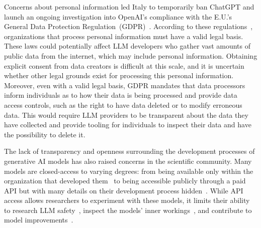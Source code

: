 \documentclass[10pt]{article} %
\begin{document}
Concerns about personal information led Italy to temporarily ban ChatGPT and launch an ongoing investigation into OpenAI's compliance with the E.U.'s General Data Protection Regulation~(GDPR)~\citep{bbc2023chatgpt_ban}. According to these regulations~\citep{eu2018gdpr,lomas2023gdpr_llms}, organizations that process personal information must have a valid legal basis. These laws could potentially affect LLM developers who gather vast amounts of public data from the internet, which may include personal information. Obtaining explicit consent from data creators is difficult at this scale, and it is uncertain whether other legal grounds exist for processing this personal information. Moreover, even with a valid legal basis, GDPR mandates that data processors inform individuals as to how their data is being processed and provide data access controls, such as the right to have data deleted or to modify erroneous data. This would require LLM providers to be transparent about the data they have collected and provide tooling for individuals to inspect their data and have the possibility to delete it.    

The lack of transparency and openness surrounding the development processes of generative AI models has also raised concerns in the scientific community. 
Many models are closed-access to varying degrees: from being available only within the organization that developed them~\citep{chowdhery2022palm,hoffmann2022training} to being accessible publicly through a paid API but with many details on their development process hidden~\citep{brown2020language,openai2023gpt4}.
While API access allows researchers to experiment with these models, it limits their ability to research LLM safety~\citep{perez2022red}, inspect the models' inner workings~\citep{olsson2022context}, and contribute to model improvements~\citep{togelius2023choose}. %
\end{document}
